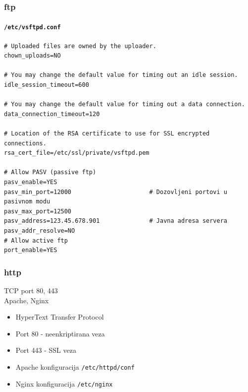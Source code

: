 \documentclass[t,table,usenames,dvipsnames]{beamer}
\begin{document}
\begin{frame}[fragile]
	\frametitle{ftp}
	\framesubtitle{\texttt{/etc/vsftpd.conf}}
	\scriptsize
	\begin{verbatim}
# Uploaded files are owned by the uploader.
chown_uploads=NO

# You may change the default value for timing out an idle session.
idle_session_timeout=600

# You may change the default value for timing out a data connection.
data_connection_timeout=120

# Location of the RSA certificate to use for SSL encrypted connections.
rsa_cert_file=/etc/ssl/private/vsftpd.pem

# Allow PASV (passive ftp)
pasv_enable=YES
pasv_min_port=12000                      # Dozovljeni portovi u pasivnom modu
pasv_max_port=12500
pasv_address=123.45.678.901              # Javna adresa servera
pasv_addr_resolve=NO
# Allow active ftp
port_enable=YES
	\end{verbatim}


\end{frame}

\begin{frame}
	\frametitle{http}
	
	TCP port 80, 443\\
	Apache, Nginx
	
	\begin{itemize}
		\item[] HyperText Transfer Protocol
		
		\item[] Port 80 - neenkriptirana veza
		\item[] Port 443 - SSL veza
	\end{itemize}
	
	\begin{itemize}
		\item[] Apache konfiguracija \texttt{/etc/httpd/conf}
		\item[] Nginx konfiguracija \texttt{/etc/nginx}
	\end{itemize}

\end{frame}
\end{document}
